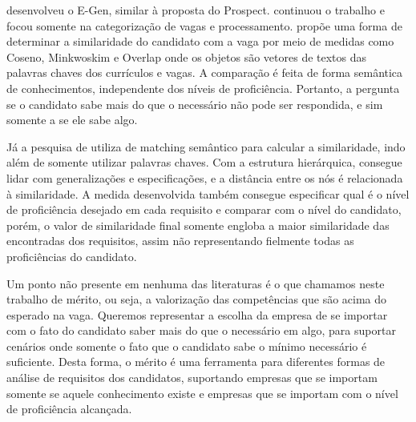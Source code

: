 \documentclass[preprint,12pt]{elsarticle}
\begin{document}
\cite{e-gen-job-processing-2007} desenvolveu o E-Gen, similar à proposta do Prospect. \cite{automatic-profiling-2008} continuou o trabalho e focou somente na categorização de vagas e processamento. \cite{improve-ranking-candidates-2009} propõe uma forma de determinar a similaridade do candidato com a vaga por meio de medidas como Coseno, Minkwoskim e Overlap onde os objetos são vetores de textos das palavras chaves dos currículos e vagas. A comparação é feita de forma semântica de conhecimentos, independente dos níveis de proficiência. Portanto, a pergunta se o candidato sabe mais do que o necessário não pode ser respondida, e sim somente a se ele sabe algo.





Já a pesquisa de \cite{impact-semantic-web-2005} utiliza de matching semântico para calcular a similaridade, indo além de somente utilizar palavras chaves. Com a estrutura hierárquica, consegue lidar com generalizações e especificações, e a distância entre os nós é relacionada à similaridade. A medida desenvolvida também consegue especificar qual é o nível de proficiência desejado em cada requisito e comparar com o nível do candidato, porém, o valor de similaridade final somente engloba a maior similaridade das encontradas dos requisitos, assim não representando fielmente todas as proficiências do candidato. 

Um ponto não presente em nenhuma das literaturas é o que chamamos neste trabalho de mérito, ou seja, a valorização das competências que são acima do esperado na vaga. Queremos representar a escolha da empresa de se importar com o fato do candidato saber mais do que o necessário em algo, para suportar cenários onde somente o fato que o candidato sabe o mínimo necessário é suficiente. Desta forma, o mérito é uma ferramenta para diferentes formas de análise de requisitos dos candidatos, suportando empresas que se importam somente se aquele conhecimento existe e empresas que se importam com o nível de proficiência alcançada.

\end{document}
